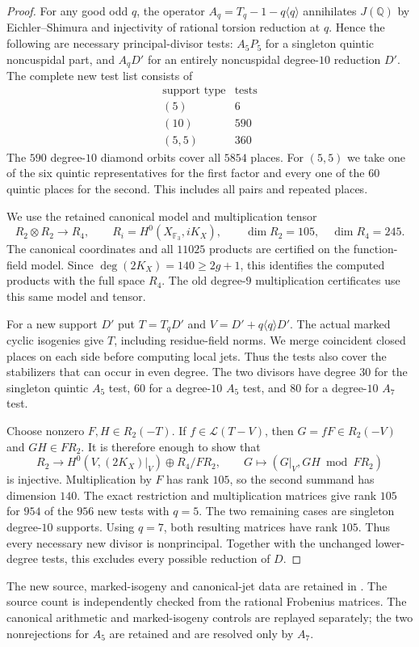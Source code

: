 \begin{proof}
For any good odd $q$, the operator $A_q=T_q-1-q\langle q\rangle$
annihilates $J(\mathbb Q)$ by Eichler--Shimura and injectivity of
rational torsion reduction at $q$.
Hence the following are necessary principal-divisor tests:
$A_5P_5$ for a singleton quintic noncuspidal part, and $A_qD'$ for
an entirely noncuspidal degree-$10$ reduction $D'$.
The complete new test list consists of
\[
\begin{array}{c|r}
\text{support type}&\text{tests}\\\hline
(5)&6\\
(10)&590\\
(5,5)&360
\end{array}
\]
The $590$ degree-$10$ diamond orbits cover all $5854$ places.
For $(5,5)$ we take one of the six quintic representatives for the first
factor and every one of the $60$ quintic places for the second.
This includes all pairs and repeated places.

We use the retained canonical model and multiplication tensor
\[
 R_2\otimes R_2\longrightarrow R_4,
 \qquad R_i=H^0(X_{\mathbb F_3},iK_X),\qquad
 \dim R_2=105,\quad\dim R_4=245.
\]
The canonical coordinates and all $11025$ products are certified on the
function-field model. Since $\deg(2K_X)=140\ge2g+1$, this identifies the
computed products with the full space $R_4$.
The old degree-$9$ multiplication certificates use this same model and tensor.

For a new support $D'$ put $T=T_qD'$ and $V=D'+q\langle q\rangle D'$.
The actual marked cyclic isogenies give $T$, including residue-field norms.
We merge coincident closed places on each side before computing local jets.
Thus the tests also cover the stabilizers that can occur in even degree.
The two divisors have degree $30$ for the singleton quintic $A_5$ test,
$60$ for a degree-$10$ $A_5$ test, and $80$ for a degree-$10$ $A_7$ test.

Choose nonzero $F,H\in R_2(-T)$.
If $f\in\mathcal L(T-V)$, then $G=fF\in R_2(-V)$ and $GH\in FR_2$.
It is therefore enough to show that
\[
 R_2\longrightarrow H^0(V,(2K_X)|_V)\oplus R_4/FR_2,
 \qquad G\longmapsto(G|_V,GH\bmod FR_2)
\]
is injective.
Multiplication by $F$ has rank $105$, so the second summand has dimension $140$.
The exact restriction and multiplication matrices give rank $105$
for $954$ of the $956$ new tests with $q=5$.
The two remaining cases are singleton degree-$10$ supports.
Using $q=7$, both resulting matrices have rank $105$.
Thus every necessary new divisor is nonprincipal.
Together with the unchanged lower-degree tests, this excludes every
possible reduction of $D$.
\end{proof}

The new source, marked-isogeny and canonical-jet data are retained in
.
The source count is independently checked from the rational Frobenius matrices.
The canonical arithmetic and marked-isogeny controls are replayed separately;
the two nonrejections for $A_5$ are retained and are resolved only by $A_7$.
